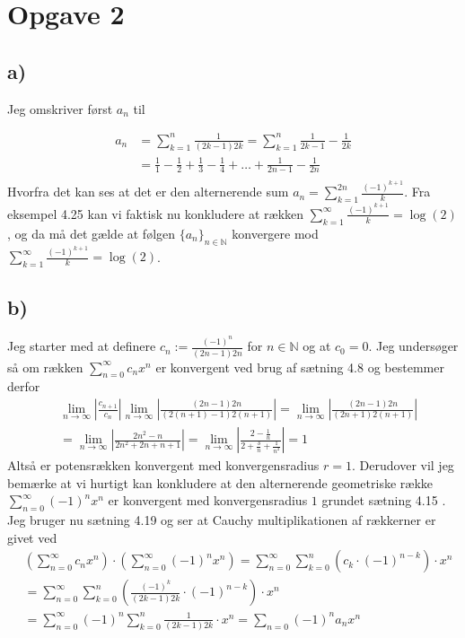 \documentclass{article}
\newcommand{\m}[1]{\mathbb{#1}}
\newcommand{\mN}{\m{N}}
\newcommand{\abs}[1]{\left| #1\right|}
\newcommand{\lr}[1]{\left( #1\right)}
\begin{document}
\newpage
\section*{Opgave 2}
\subsection*{a)}
Jeg omskriver først $a_n$ til 

\begin{align*}
    a_n &= \sum_{k=1}^{n} \frac{1}{(2k-1)2k} 
    = \sum_{k=1}^{n} \frac{1}{2k-1} - \frac{1}{2k}  \\
    &= \frac{1}{1} - \frac{1}{2} + \frac{1}{3} - \frac{1}{4} + \dots + \frac{1}{2n-1} - \frac{1}{2n} \\
\end{align*}
Hvorfra det kan ses at det er den alternerende sum $a_n = \sum_{k=1}^{2n} \frac{(-1)^{k+1}}{k}$.
Fra eksempel 4.25 \cite[s. 151]{an1} kan vi faktisk nu konkludere at rækken
$\sum_{k=1}^{\infty} \frac{(-1)^{k+1}}{k} = \log(2)$, og da må det gælde at følgen $\{a_n\}_{n \in \mN}$ konvergere mod
$\sum_{k=1}^{\infty} \frac{(-1)^{k+1}}{k} = \log(2)$.

\subsection*{b)}
Jeg starter med at definere $c_n := \frac{(-1)^{n}}{(2n-1)2n}$ for $n \in \mN$ 
og at $c_0 = 0$.
Jeg undersøger så om rækken $\sum_{n=0}^{\infty} c_n x^n$ 
er konvergent ved brug af sætning 4.8 \cite{an1} og bestemmer derfor 
\begin{align*}
    & \lim_{n \to \infty} \abs{\frac{c_{n+1}}{c_n}} \lim_{n \to \infty} |\frac{(2n-1)2n}{(2(n+1) -1)2(n+1)}| 
    = \lim_{n \to \infty} |\frac{(2n-1)2n}{(2n+1)2(n+1)}|  \\
    &= \lim_{n \to \infty} |\frac{2n^2-n}{2n^2 + 2n + n + 1}| 
    = \lim_{n \to \infty} |\frac{2-\frac{1}{n}}{2 + \frac{3}{n} + \frac{1}{n^2}}|
    = 1
\end{align*}
Altså er potensrækken konvergent med konvergensradius $r=1$. Derudover vil jeg bemærke at
vi hurtigt kan konkludere at den alternerende geometriske række $\sum_{n=0}^{\infty} (-1)^n x^n$ 
er konvergent med konvergensradius $1$ grundet sætning 4.15 \cite{an1}.
Jeg bruger nu sætning 4.19 \cite{an1} og ser at Cauchy multiplikationen af rækkerner er givet ved
\begin{align*}
    &\lr{\sum_{n=0}^{\infty} c_n x^n} \cdot \lr{\sum_{n=0}^{\infty} (-1)^n x^n}
    =\sum_{n=0}^{\infty} \sum_{k=0}^{n} (c_k \cdot (-1)^{n-k}) \cdot x^n \\
    &=\sum_{n=0}^{\infty} \sum_{k=0}^{n} (\frac{(-1)^{k}}{(2k-1)2k} \cdot (-1)^{n-k}) \cdot x^n  \\
    &= \sum_{n=0}^{\infty} (-1)^n \sum_{k=0}^{n} \frac{1}{(2k-1)2k} \cdot x^n
    = \sum_{n=0} (-1)^n a_n x^n
\end{align*}
\end{document}
